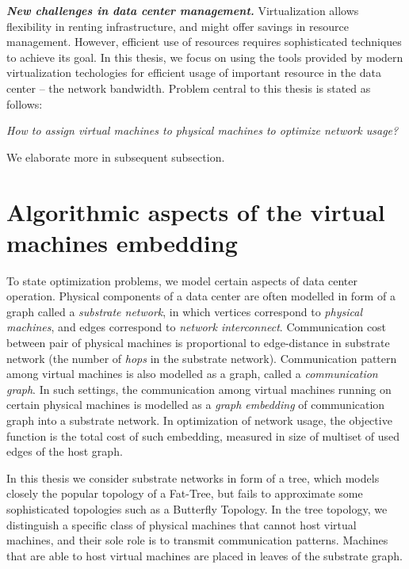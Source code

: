 \textbf{\emph{New challenges in data center management.}}
Virtualization allows flexibility in renting infrastructure, and might offer savings in resource management.
However, efficient use of resources requires sophisticated techniques to achieve its goal.
In this thesis, we focus on using the tools provided by modern virtualization techologies for efficient usage of important resource in the data center -- the network bandwidth.
Problem central to this thesis is stated as follows:

\begin{center}
  \emph{How to assign virtual machines to physical machines to optimize network usage?}
\end{center}

We elaborate more in subsequent subsection.

\section{Algorithmic aspects of the virtual machines embedding}

To state optimization problems, we model certain aspects of data center operation.
Physical components of a data center are often modelled in form of a graph called a \emph{substrate network}, in which vertices correspond to \emph{physical machines}, and edges correspond to \emph{network interconnect}.
Communication cost between pair of physical machines is proportional to edge-distance in substrate network (the number of \emph{hops} in the substrate network).
Communication pattern among virtual machines is also modelled as a graph, called a \emph{communication graph}.
In such settings, the communication among virtual machines running on certain physical machines is modelled as a \emph{graph embedding} of communication graph into a substrate network.
In optimization of network usage, the objective function is the total cost of such embedding, measured in size of multiset of used edges of the host graph.

In this thesis we consider substrate networks in form of a tree, which models closely the popular topology of a Fat-Tree, but fails to approximate some sophisticated topologies such as a Butterfly Topology.
In the tree topology, we distinguish a specific class of physical machines that cannot host virtual machines, and their sole role is to transmit communication patterns.
Machines that are able to host virtual machines are placed in leaves of the substrate graph.


